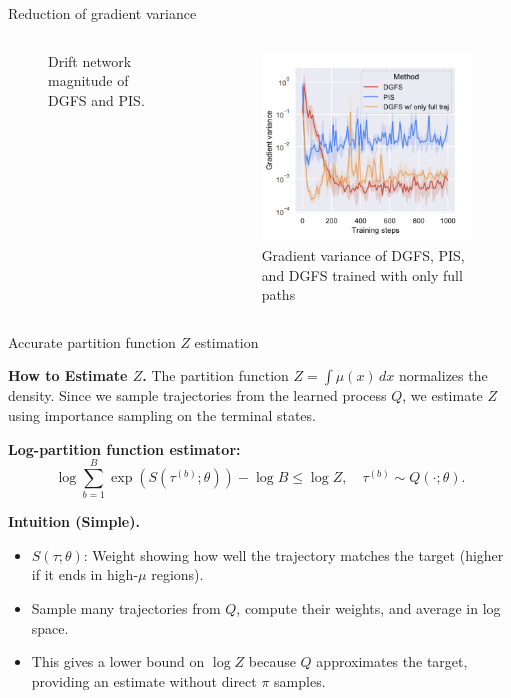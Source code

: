 \documentclass[aspectratio=169,xcolor=dvipsnames]{beamer}
\begin{document}
\begin{frame}[t]{Reduction of gradient variance}
\begin{columns}[t]
\begin{column}{0.33\textwidth}
\begin{figure}
    \caption{Drift network magnitude of DGFS and PIS.}
\end{figure}
\end{column}
\begin{column}{0.33\textwidth}
\begin{figure}
    \centering
    \includegraphics[width=\textwidth]{figures/grad_variance_2.png}
    \caption{Gradient variance of
DGFS, PIS, and DGFS trained
with only full paths}
\end{figure}
\end{column}
\end{columns}

\end{frame}


\begin{frame}[t]{Accurate partition function $Z$ estimation}
\footnotesize

\textbf{How to Estimate $Z$.} The partition function $Z = \int \mu(x) \, dx$ normalizes the density. Since we sample trajectories from the learned process $Q$, we estimate $Z$ using importance sampling on the terminal states.

\textbf{Log-partition function estimator:}
\[
\log \sum_{b=1}^B \exp(S(\tau^{(b)}; \theta)) - \log B \leq \log Z, \quad \tau^{(b)} \sim Q(\cdot; \theta).
\]

\textbf{Intuition (Simple).}
\begin{itemize}\itemsep2pt
  \item $S(\tau; \theta)$: Weight showing how well the trajectory matches the target (higher if it ends in high-$\mu$ regions).
  \item Sample many trajectories from $Q$, compute their weights, and average in log space.
  \item This gives a lower bound on $\log Z$ because $Q$ approximates the target, providing an estimate without direct $\pi$ samples.
\end{itemize}

\end{frame}
\end{document}
